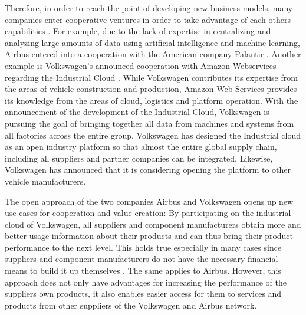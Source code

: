 Therefore, in order to reach the point of developing new business models, many companies  enter cooperative ventures in order to take advantage of each others capabilities \cite[]{Russo2018HowCompetition}. For example, due to the lack of expertise in centralizing and analyzing large amounts of data using artificial intelligence and machine learning, Airbus entered into a cooperation with the American company Palantir \cite[]{Hanke2019AirbusWerden}. Another example is Volkswagen's announced cooperation with Amazon Webservices regarding the Industrial Cloud \cite[]{VolkswagenAG2019WirLive}. While Volkswagen contributes its expertise from the areas of vehicle construction and production, Amazon Web Services provides its knowledge from the areas of cloud, logistics and platform operation. With the announcement of the development of the Industrial Cloud, Volkswagen is pursuing the goal of bringing together all data from machines and systems from all factories across the entire group. Volkswagen has designed the Industrial cloud as an open industry platform so that almost the entire global supply chain, including all suppliers and partner companies can be integrated. Likewise, Volkswagen has announced that it is considering opening the platform to other vehicle manufacturers.

The open approach of the two companies Airbus and Volkswagen opens up new use cases for cooperation and value creation: By participating on the industrial cloud of Volkswagen, all suppliers and component manufacturers obtain more and better usage information about their products and can thus bring their product performance to the next level. This holds true especially in many cases since suppliers and component manufacturers do not have the necessary financial means to build it up themselves \cite[]{Russo2018HowCompetition}. The same applies to Airbus. However, this approach does not only have advantages for increasing the performance of the suppliers own products, it also enables easier access for them to services and products from other suppliers of the Volkswagen and Airbus network. 

